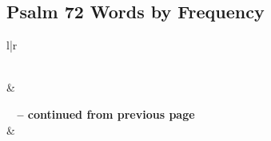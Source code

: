 

\subsection{Psalm 72 Words by Frequency}


\normalsize
 
\begin{center}
\begin{longtable}{l|r}
\caption[Psalm 72 Words by Frequency]{Psalm 72 Words by Frequency}\label{table:WordsbyFrequency for Psalm 72} \\
\hline {} &  \\ \hline 
\endfirsthead
 
{{\bfseries \tablename\ \thetable{} -- continued from previous page}} \\  
\hline {} &  \\ \hline 
\endhead
 

\end{longtable}
\end{center}

